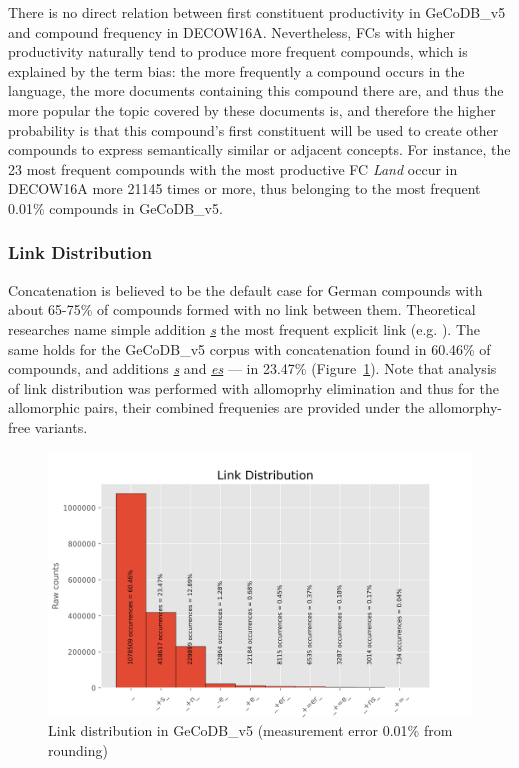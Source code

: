 \documentclass[11pt]{article}
\begin{document}
There is no direct relation between first constituent productivity in GeCoDB\_v5 and compound frequency in DECOW16A. Nevertheless, FCs with higher productivity naturally tend to produce more frequent compounds, which is explained by the term bias: the more frequently a compound occurs in the language, the more documents containing this compound there are, and thus the more popular the topic covered by these documents is, and therefore the higher probability is that this compound's first constituent will be used to create other compounds to express semantically similar or adjacent concepts. For instance, the 23 most frequent compounds with the most productive FC \textit{Land} occur in DECOW16A more 21145 times or more, thus belonging to the most frequent 0.01\% compounds in GeCoDB\_v5.


\subsubsection{Link Distribution}
\label{subsec:link_distr}

Concatenation is believed to be the default case for German compounds with about 65-75\% of compounds formed with no link between them. Theoretical researches name simple addition \textit{\underline{s}} the most frequent explicit link (e.g. \citealt{schafer_2018_1323211}). The same holds for the GeCoDB\_v5 corpus with concatenation found in 60.46\% of compounds, and additions \textit{\underline{s}} and \textit{\underline{es}} --- in 23.47\% (Figure~\ref{fig:link_distr}). 
Note that analysis of link distribution was performed with allomoprhy elimination and thus for the allomorphic pairs, their combined frequenies are provided under the allomorphy-free variants.

\begin{figure}[hbt!]
    \centering
    \includegraphics[width=\textwidth]{figs/link_distr_v05.png}
    \caption{Link distribution in GeCoDB\_v5 (measurement error 0.01\% from rounding)}
    \label{fig:link_distr}
\end{figure}
\end{document}
